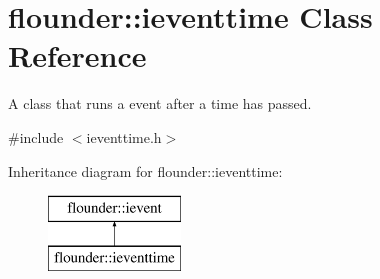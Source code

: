 \hypertarget{classflounder_1_1ieventtime}{}\section{flounder\+:\+:ieventtime Class Reference}
\label{classflounder_1_1ieventtime}


A class that runs a event after a time has passed.  




{\ttfamily \#include $<$ieventtime.\+h$>$}

Inheritance diagram for flounder\+:\+:ieventtime\+:\begin{figure}[H]
\begin{center}
\leavevmode
\includegraphics[height=2.000000cm]{classflounder_1_1ieventtime}
\end{center}
\end{figure}
